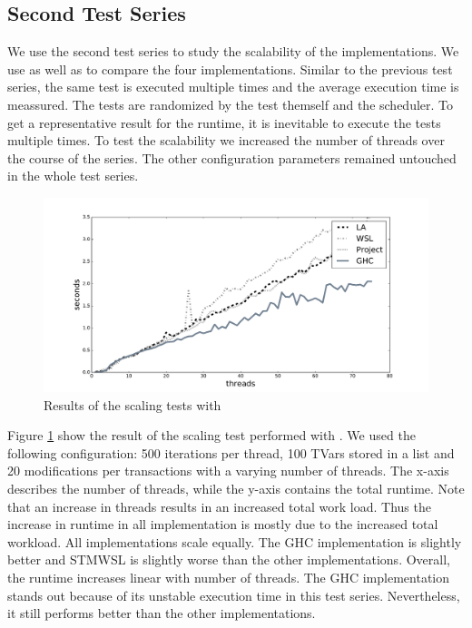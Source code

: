 \subsection{Second Test Series}
We use the second test series to study the scalability of the implementations. We use  as well as
 to compare the four implementations. Similar to the previous test series, the same test
is executed multiple times and the average execution time is meassured. The tests are randomized by the test themself 
and the scheduler. To get a representative result for the runtime, it is inevitable to execute the tests multiple 
times. To test the scalability we increased the number of threads over the course of the series. The other 
configuration parameters remained untouched in the whole test series. 
\begin{figure}
 \centering
 \includegraphics[scale=0.4]{Figures/Scaling1}
\caption[Runtime: Scaling Test I]{Results of the scaling tests with }
\label{fig:scaling1}
\end{figure}

Figure \ref{fig:scaling1} show the result of the scaling test performed with . We used the following 
configuration: 500 iterations per thread, 100 TVars stored in a list and 20 modifications per transactions with 
a varying number of threads. The x-axis describes the number of threads, while the y-axis contains the total runtime.
Note that an increase in threads results in an increased total work load. Thus the increase in runtime in all implementation
is mostly due to the increased total workload.
All implementations scale equally. The GHC implementation is slightly better and STMWSL is slightly worse than the other 
implementations. Overall, the runtime increases linear with number of threads. The GHC implementation stands out because of
its unstable execution time in this test series. Nevertheless, it still performs better than the other implementations.

